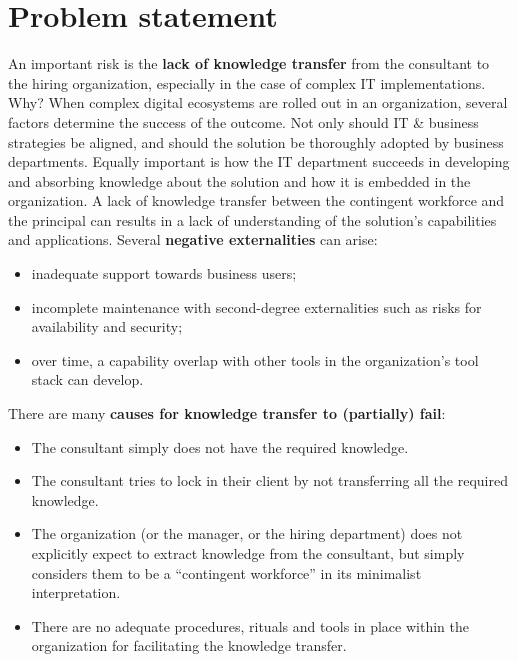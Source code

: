 \documentclass[12pt]{article}
\providecommand{\tightlist}{%
  \setlength{\itemsep}{0pt}\setlength{\parskip}{0pt}}
\begin{document}
\hypertarget{problem-statement}{%
\section{Problem statement}\label{problem-statement}}

An important risk is the \textbf{lack of knowledge transfer} from the
consultant to the hiring organization, especially in the case of complex
IT implementations. Why? When complex digital ecosystems are rolled out
in an organization, several factors determine the success of the
outcome. Not only should IT \& business strategies be aligned, and
should the solution be thoroughly adopted by business departments.
Equally important is how the IT department succeeds in developing and
absorbing knowledge about the solution and how it is embedded in the
organization. A lack of knowledge transfer between the contingent
workforce and the principal can results in a lack of understanding of
the solution's capabilities and applications. Several \textbf{negative
externalities} can arise:

\begin{itemize}
\tightlist
\item
  inadequate support towards business users;
\item
  incomplete maintenance with second-degree externalities such as risks
  for availability and security;
\item
  over time, a capability overlap with other tools in the organization's
  tool stack can develop.
\end{itemize}

There are many \textbf{causes for knowledge transfer to (partially)
fail}:

\begin{itemize}
\tightlist
\item
  The consultant simply does not have the required knowledge.
\item
  The consultant tries to lock in their client by not transferring all
  the required knowledge.
\item
  The organization (or the manager, or the hiring department) does not
  explicitly expect to extract knowledge from the consultant, but simply
  considers them to be a ``contingent workforce'' in its minimalist
  interpretation.
\item
  There are no adequate procedures, rituals and tools in place within
  the organization for facilitating the knowledge transfer.
\end{itemize}
\end{document}
